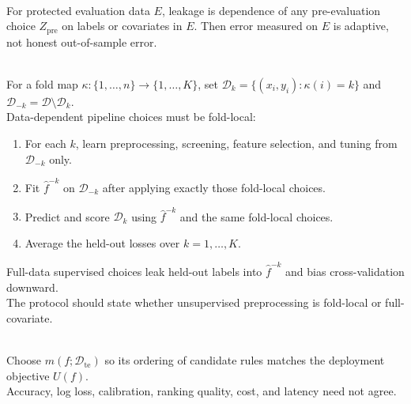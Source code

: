 \begin{remark} \label{rem:sl-data-leakage} \\
For protected evaluation data $E$, leakage is dependence of any pre-evaluation choice $Z_{\mathrm{pre}}$ on labels or covariates in $E$. Then error measured on $E$ is adaptive, not honest out-of-sample error.
\end{remark}

\begin{method} \label{meth:sl-cross-validation-with-screening} \\
For a fold map $\kappa:\{1,\ldots,n\}\to\{1,\ldots,K\}$, set $\mathcal{D}_k=\{(x_i,y_i):\kappa(i)=k\}$ and $\mathcal{D}_{-k}=\mathcal{D}\setminus\mathcal{D}_k$.\\
Data-dependent pipeline choices must be fold-local:
\begin{enumerate}[label=(\roman*)]
\setlength{\itemsep}{0pt}
\item For each $k$, learn preprocessing, screening, feature selection, and tuning from $\mathcal{D}_{-k}$ only.
\item Fit $\widehat f^{-k}$ on $\mathcal{D}_{-k}$ after applying exactly those fold-local choices.
\item Predict and score $\mathcal{D}_k$ using $\widehat f^{-k}$ and the same fold-local choices.
\item Average the held-out losses over $k=1,\ldots,K$.
\end{enumerate}
Full-data supervised choices leak held-out labels into $\widehat f^{-k}$ and bias cross-validation downward.\\
The protocol should state whether unsupervised preprocessing is fold-local or full-covariate.
\end{method}

\begin{remark} \label{rem:sl-metric-choice} \\
Choose $m(f;\mathcal{D}_{\mathrm{te}})$ so its ordering of candidate rules matches the deployment objective $U(f)$.\\
Accuracy, log loss, calibration, ranking quality, cost, and latency need not agree.
\end{remark}


